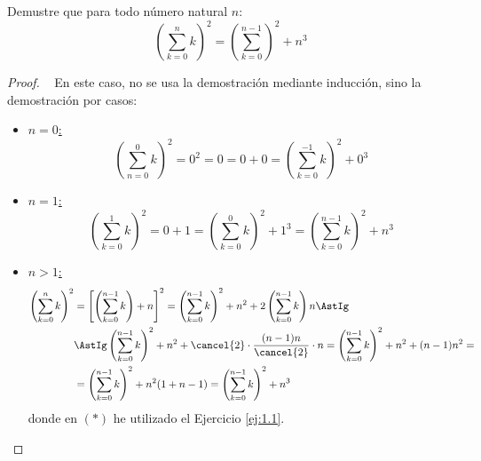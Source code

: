 \begin{ejercicio}\label{ej:1.2}
    Demustre que para todo número natural $n$:
    $$\left(\sum_{k=0}^n k\right)^2 = \left(\sum_{k=0}^{n-1}\right)^2 + n^3$$
\begin{proof}~
    En este caso, no se usa la demostración mediante inducción, sino la demostración por casos:
    \begin{itemize}
        \item \ul{$n = 0$:}
            $$\left(\sum_{n=0}^0 k\right)^2 = 0^2 = 0 = 0+0 = \left(\sum_{k=0}^{-1}k\right)^2 + 0^3$$
        \item \ul{$n = 1$:}
            $$\left(\sum_{k=0}^1 k\right)^2 = 0+1 = \left(\sum_{k=0}^0 k\right)^2 + 1^3 = \left(\sum_{k=0}^{n-1} k\right)^2 + n^3$$
        \item \ul{$n > 1$:}
        \begin{align*}
            \left(\sum_{k=0}^n k\right)^2 &= \left[\left(\sum_{k=0}^{n-1} k\right) + n\right]^2 = \left(\sum_{k=0}^{n-1}k\right)^2 + n^2 + 2\left(\sum_{k=0}^{n-1} k\right)n \AstIg\\
            &\AstIg \left(\sum_{k=0}^{n-1}k\right)^2 + n^2 + \cancel{2} \cdot \dfrac{(n-1)n}{\cancel{2}}\cdot n = \left(\sum_{k=0}^{n-1}k\right)^2 + n^2 + (n-1)n^2 =\\
            &= \left(\sum_{k=0}^{n-1}k\right)^2 + n^2 (1+n-1) = \left(\sum_{k=0}^{n-1}k\right)^2 + n^3
        \end{align*}
        donde en $(\ast)$ he utilizado el Ejercicio \ref{ej:1.1}.
    \end{itemize}
\end{proof}
\end{ejercicio}

